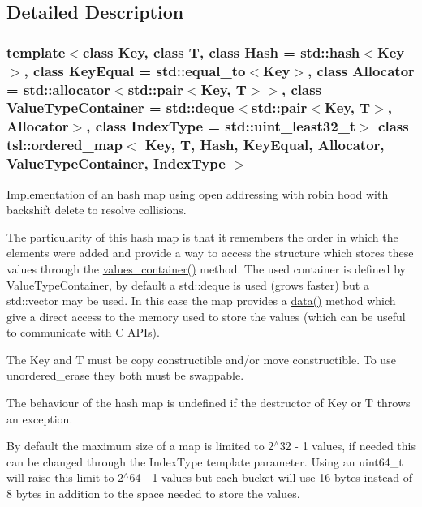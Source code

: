 \subsection{Detailed Description}
\subsubsection*{template$<$class Key, class T, class Hash = std\+::hash$<$\+Key$>$, class Key\+Equal = std\+::equal\+\_\+to$<$\+Key$>$, class Allocator = std\+::allocator$<$std\+::pair$<$\+Key, T$>$$>$, class Value\+Type\+Container = std\+::deque$<$std\+::pair$<$\+Key, T$>$, Allocator$>$, class Index\+Type = std\+::uint\+\_\+least32\+\_\+t$>$\newline
class tsl\+::ordered\+\_\+map$<$ Key, T, Hash, Key\+Equal, Allocator, Value\+Type\+Container, Index\+Type $>$}

Implementation of an hash map using open addressing with robin hood with backshift delete to resolve collisions.

The particularity of this hash map is that it remembers the order in which the elements were added and provide a way to access the structure which stores these values through the \textquotesingle{}\mbox{\hyperlink{classtsl_1_1ordered__map_abb69bca0a80def48ae806078d77175cb}{values\+\_\+container()}}\textquotesingle{} method. The used container is defined by Value\+Type\+Container, by default a std\+::deque is used (grows faster) but a std\+::vector may be used. In this case the map provides a \textquotesingle{}\mbox{\hyperlink{classtsl_1_1ordered__map_aad8598e2f2dfeed429cfe80a1884ba20}{data()}}\textquotesingle{} method which give a direct access to the memory used to store the values (which can be useful to communicate with C A\+PI\textquotesingle{}s).

The Key and T must be copy constructible and/or move constructible. To use {\ttfamily unordered\+\_\+erase} they both must be swappable.

The behaviour of the hash map is undefined if the destructor of Key or T throws an exception.

By default the maximum size of a map is limited to 2$^\wedge$32 -\/ 1 values, if needed this can be changed through the Index\+Type template parameter. Using an {\ttfamily uint64\+\_\+t} will raise this limit to 2$^\wedge$64 -\/ 1 values but each bucket will use 16 bytes instead of 8 bytes in addition to the space needed to store the values.

